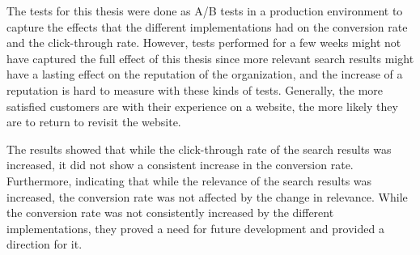 The tests for this thesis were done as A/B tests in a production environment to capture the 
effects that the different implementations had on the conversion rate and the click-through rate.
However, tests performed for a few weeks might not have captured the full effect of this thesis 
since more relevant search results might have a lasting effect on the reputation of the organization, 
and the increase of a reputation is hard to measure with these kinds of tests. 
Generally, the more satisfied customers are with their experience on a website, 
the more likely they are to return to revisit the website.


The results showed that while the click-through rate of the search results was increased, it did not
show a consistent increase in the conversion rate. 
Furthermore, indicating that while the relevance of the search results was increased, the conversion
rate was not affected by the change in relevance.
While the conversion rate was not consistently increased by the different implementations, they
proved a need for future development and provided a direction for it.



